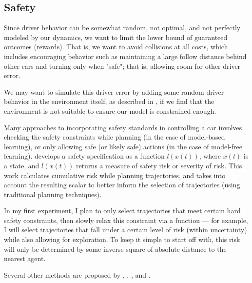 \documentclass{article}
\begin{document}
\subsection{Safety}

Since driver behavior can be somewhat random, not optimal, and not perfectly modeled by our dynamics, we want to limit the lower bound of guaranteed outcomes (rewards). That is, we want to avoid collisions at all costs, which includes encouraging behavior such as maintaining a large follow distance behind other cars and turning only when "safe"; that is, allowing room for other driver error.

We may want to simulate this driver error by adding some random driver behavior in the environment itself, as described in \cite{Rana_2021}, if we find that the environment is not suitable to ensure our model is constrained enough.

Many approaches to incorporating safety standards in controlling a car involves checking the safety constraints while planning (in the case of model-based learning), or only allowing safe (or likely safe) actions (in the case of model-free learning). \cite{nyberg2021safetyspec} develops a safety specification as a function $l(x(t))$, where $x(t)$ is a state, and $l(x(t))$ returns a measure of safety risk or severity of risk. This work calculates cumulative risk while planning trajectories, and takes into account the resulting scalar to better inform the selection of trajectories (using traditional planning techniques).

In my first experiment, I plan to only select trajectories that meet certain hard safety constraints, then slowly relax this constraint via a function — for example, I will select trajectories that fall under a certain level of risk (within uncertainty) while also allowing for exploration. To keep it simple to start off with, this risk will only be determined by some inverse square of absolute distance to the nearest agent.

Several other methods are proposed by \cite{shalevshwartz2016safe}, \cite{dalal2018safe}, \cite{berkenkamp2017safe}, and \cite{10.1145/3563357.3564055}.


\end{document}
